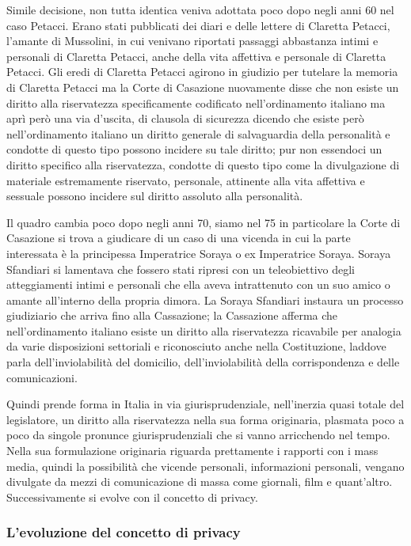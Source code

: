 Simile decisione, non tutta identica veniva adottata poco dopo negli anni 60 nel caso Petacci. Erano stati pubblicati dei diari e delle lettere di Claretta Petacci, l'amante di Mussolini, in cui venivano riportati passaggi abbastanza intimi e personali di Claretta Petacci, anche della vita affettiva e personale di Claretta Petacci. Gli eredi di Claretta Petacci agirono in giudizio per tutelare la memoria di Claretta Petacci ma la Corte di Casazione nuovamente disse che non esiste un diritto alla riservatezza specificamente codificato nell'ordinamento italiano ma aprì però una via d'uscita,  di clausola di sicurezza dicendo che esiste però nell'ordinamento italiano un diritto generale di salvaguardia della personalità e condotte di questo tipo possono incidere su tale diritto; pur non essendoci un diritto specifico alla riservatezza, condotte di questo tipo come la divulgazione di materiale estremamente riservato, personale, attinente alla vita affettiva e sessuale possono incidere sul diritto assoluto alla personalità. 

Il quadro cambia poco dopo negli anni 70, siamo nel 75 in particolare la Corte di Casazione si trova a giudicare di un caso di una vicenda in cui la parte interessata è la principessa Imperatrice Soraya o ex Imperatrice Soraya. 
Soraya Sfandiari si lamentava che fossero stati ripresi con un teleobiettivo degli atteggiamenti intimi e personali che ella aveva intrattenuto con un suo amico o amante all'interno della propria dimora. La Soraya Sfandiari instaura un processo giudiziario che arriva fino alla Cassazione; la Cassazione afferma che nell'ordinamento italiano esiste un diritto alla riservatezza ricavabile per analogia da varie disposizioni settoriali e riconosciuto anche nella Costituzione, laddove parla dell'inviolabilità del domicilio, dell'inviolabilità della corrispondenza e delle comunicazioni. 

Quindi prende forma in Italia in via giurisprudenziale, nell'inerzia quasi totale del legislatore, un diritto alla riservatezza nella sua forma originaria, plasmata poco a poco da singole pronunce giurisprudenziali che si vanno arricchendo nel tempo. Nella sua formulazione originaria riguarda prettamente i rapporti con i mass media, quindi la possibilità che vicende personali, informazioni personali, vengano divulgate da mezzi di comunicazione di massa come giornali, film e quant'altro. Successivamente si evolve con il concetto di privacy.

\subsubsection{L'evoluzione del concetto di privacy}


